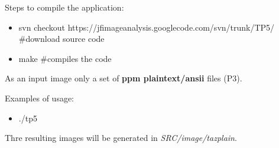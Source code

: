 \documentclass{article}
\begin{document}
	Steps to compile the application:
	
	\begin{itemize}
		\item svn checkout https://jfimageanalysis.googlecode.com/svn/trunk/TP5/ \#download source code
		\item make \#compiles the code
	\end{itemize}

	As an input image only a set of {\bf ppm plaintext/ansii} files (P3). 

	Examples of usage:

	\begin{itemize}
		\item ./tp5
	\end{itemize}

	Thre resulting images will be generated in \emph{SRC/image/tazplain}.
\end{document}
